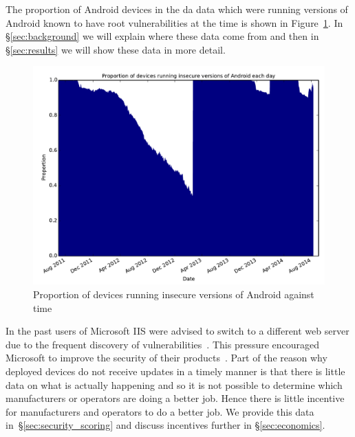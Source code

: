 \documentclass[conference,a4paper,twoside]{IEEEtran}
\begin{document}
The proportion of Android devices in the da data which were running versions of Android known to have root vulnerabilities at the time is shown in Figure~\ref{fig:proportioninsecure}.
In \S\ref{sec:background} we will explain where these data come from and then in \S\ref{sec:results} we will show these data in more detail.

\begin{figure}[!b]
\centering
\includegraphics[width=\columnwidth]{figures/proportioninsecure}
\caption{Proportion of devices running insecure versions of Android against time}
\label{fig:proportioninsecure}
\end{figure}

In the past users of Microsoft IIS were advised to switch to a different web server due to the frequent discovery of vulnerabilities~\cite{Pescatore2001}.
This pressure encouraged Microsoft to improve the security of their products~\cite{TODO}.
Part of the reason why deployed devices do not receive updates in a timely manner is that there is little data on what is actually happening and so it is not possible to determine which manufacturers or operators are doing a better job.
Hence there is little incentive for manufacturers and operators to do a better job.
We provide this data  in~\S\ref{sec:security_scoring} and discuss incentives further in \S\ref{sec:economics}.
\end{document}
